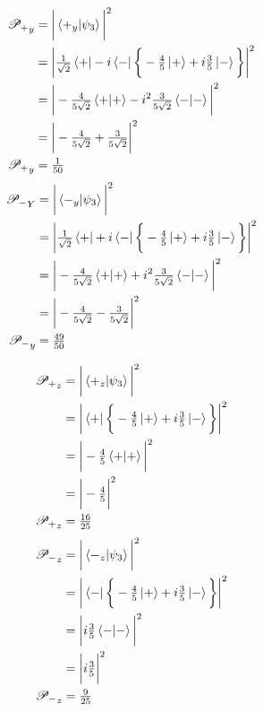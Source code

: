 \documentclass[paper=a4, fontsize=11pt]{scrartcl} %
\numberwithin{equation}{section} %
\numberwithin{figure}{section} %
\numberwithin{table}{section} %
\begin{document}
   \begin{multicols}{2}
 \noindent
\begin{align*}
\mathscr{P_+}_y & = \bigg | \braket{+_y|\psi_3} \bigg|^2 \\
& = \bigg | \tfrac{1}{\sqrt{2}}\bra{+} - i\bra{-} \bigg \{ -\tfrac{4}{5}\ket{+} + i\tfrac{3}{5}\ket{-} \bigg \} \bigg |^2 \\
& = \bigg | - \tfrac{4}{5\sqrt{2}}\braket{+|+} - i^2\tfrac{3}{5\sqrt{2}} \braket{-|-}  \bigg |^2 \\
  & = \bigg |  -\tfrac{4}{5\sqrt{2}} + \tfrac{3}{5\sqrt{2}} \bigg |^2 \\
  \mathscr{P_+}_y & = \tfrac{1}{50}
  \end{align*}
   \begin{align*}
\mathscr{P_-}_Y & = \bigg |  \braket{-_y|\psi_3} \bigg|^2 \\
& = \bigg | \tfrac{1}{\sqrt{2}} \bra{+} + i \bra{-} \bigg \{ -\tfrac{4}{5}\ket{+} + i\tfrac{3}{5}\ket{-} \bigg \} \bigg |^2 \\
& = \bigg |  -\tfrac{4}{5\sqrt{2}}\braket{+|+} + i^2\tfrac{3}{5\sqrt{2}} \braket{-|-}  \bigg |^2 \\
 & = \bigg |  -\tfrac{4}{5\sqrt{2}} - \tfrac{3}{5\sqrt{2}} \bigg |^2 \\
  \mathscr{P_-}_y & = \tfrac{49}{50}
  \end{align*}
  \end{multicols}
   \begin{multicols}{2}
 \noindent
\begin{align*}
\mathscr{P_+}_z & = \bigg | \braket{+_z|\psi_3} \bigg|^2 \\
& = \bigg | \bra{+}  \bigg \{ -\tfrac{4}{5}\ket{+} + i\tfrac{3}{5}\ket{-} \bigg \} \bigg |^2 \\
& = \bigg |  -\tfrac{4}{5}\braket{+|+}  \bigg |^2 \\
  & = \bigg |  -\tfrac{4}{5} \bigg |^2 \\
  \mathscr{P_+}_z & = \tfrac{16}{25}
  \end{align*}
   \begin{align*}
\mathscr{P_-}_z & = \bigg |  \braket{-_z|\psi_3} \bigg|^2 \\
& = \bigg |  \bra{-} \bigg \{ -\tfrac{4}{5}\ket{+} + i\tfrac{3}{5}\ket{-} \bigg \} \bigg |^2 \\
& = \bigg |    i\tfrac{3}{5} \braket{-|-}  \bigg |^2 \\
 & = \bigg |  i \tfrac{3}{5} \bigg |^2 \\
  \mathscr{P_-}_z & = \tfrac{9}{25}
  \end{align*}
  \end{multicols}
\end{document}
